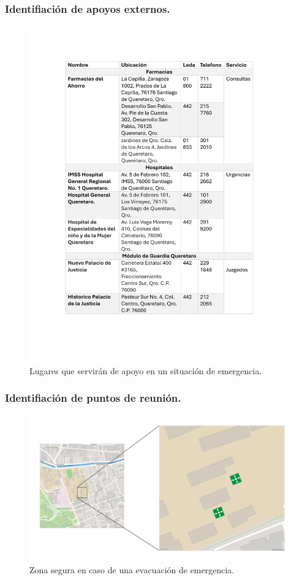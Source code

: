    \subsubsection{Identifiación de apoyos externos.}
    \begin{figure}[H]
        \centering
        \includegraphics[scale=0.4]{15/img/tablaApoyosExternos.pdf}
        \caption{Lugares que servirán de apoyo en un situación de emergencia.}
        \label{fig:tablaApoyosExternos}
    \end{figure}
    \subsubsection{Identifiación de puntos de reunión.}
    \begin{figure}[H]
        \centering
        \includegraphics[scale=0.15]{15/img/mapaPuntosDeReunion.pdf}
        \caption{Zona segura en caso de una evacuación de emergencia.}
        \label{fig:mapaPuntosDeReunion}
    \end{figure}

